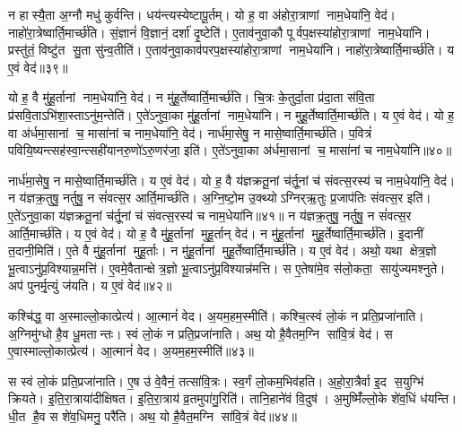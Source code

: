    न हास्यै॒ता अ॒ग्नौ मधु॑ कुर्वन्ति।
   धय॑न्त्यस्येष्टापू॒र्तम्।
   यो ह॒ वा अ॑होरा॒त्राणां नाम॒धेया॑नि॒ वेद॑।
   नाहो॑रा॒त्रेष्वार्ति॒मार्च्छ॑ति।
   सं॒ज्ञानं॑ वि॒ज्ञानं॒ दर्\mbox{}शा॑ दृ॒ष्टेति॑।
   ए॒ताव॑नुवा॒कौ पूर्वप॒क्षस्या॑\-होरा॒त्राणां नाम॒धेया॑नि।
   प्रस्तु॑तं॒ विष्टु॑त सु॒ता सु॑न्व॒तीति॑।
   ए॒ताव॑नुवा॒काव॑पर\-प॒क्षस्या॑होरा॒त्राणां नाम॒धेया॑नि।
   नाहो॑रा॒त्रेष्वार्ति॒मार्च्छ॑ति।
   य ए॒वं वेद॑॥३९॥

   यो ह॒ वै मु॑हू॒र्तानां नाम॒धेया॑नि॒ वेद॑।
   न मु॑हू॒र्तेष्वार्ति॒मार्च्छ॑ति।
   चि॒त्रः के॒तुर्दा॒ता प्र॑दा॒ता स॑वि॒ता प्र॑सवि॒ताऽभि॑शा॒स्ताऽनु॑\-म॒न्तेति॑।
   ए॒ते॑ऽनुवा॒का मु॑हू॒र्तानां नाम॒धेया॑नि।
   न मुहू॒र्तेष्वार्ति॒मार्च्छ॑ति।
   य ए॒वं वेद॑।
   यो ह॒ वा अ॑र्धमा॒सानां च॒ मासा॑नां च नाम॒धेया॑नि॒ वेद॑।
   नार्ध॑मा॒सेषु॒ न मासे॒ष्वार्ति॒मार्च्छ॑ति।
   प॒वित्रं॑ पवियि॒ष्यन्त्सह॑\-स्वा॒न्त्सही॑यानरु॒णो॑ऽरु॒णर॑जा॒ इति॑।
   ए॒ते॑ऽनुवा॒का अ॑र्धमा॒सानां च॒ मासा॑नां च नाम॒धेया॑नि॥४०॥

   नार्ध॑मा॒सेषु॒ न मासे॒ष्वार्ति॒मार्च्छ॑ति।
   य ए॒वं वेद॑।
   यो ह॒ वै य॑ज्ञक्रतू॒नां च॑र्तू॒नां च॑ संवत्स॒रस्य॑ च नाम॒धेया॑नि॒ वेद॑।
   न य॑ज्ञक्र॒तुषु॒ नर्तुषु॒ न सं॑वत्स॒र आर्ति॒मार्च्छ॑ति।
   अ॒ग्नि॒ष्टो॒म उ॒क्थ्योऽग्निर्{‌}ऋ॒तुः प्र॒जाप॑तिः संवत्स॒र इति॑।
   ए॒ते॑ऽनुवा॒का य॑ज्ञक्रतू॒नां च॑र्तू॒नां च॑ संवत्स॒रस्य॑ च नाम॒धेया॑नि॥४१॥
   न य॑ज्ञक्र॒तुषु॒ नर्तुषु॒ न सं॑वत्स॒र आर्ति॒मार्च्छ॑ति।
   य ए॒वं वेद॑।
   यो ह॒ वै मु॑हू॒र्तानां मुहू॒र्तान् वेद॑।
   न मु॑हू॒र्तानां मुहू॒र्तेष्वार्ति॒मार्च्छ॑ति।
   इ॒दानीं त॒दानी॒मिति॑।
   ए॒ते वै मु॑हू॒र्तानां मुहू॒र्ताः।
   न मु॑हू॒र्तानां मुहू॒र्तेष्वार्ति॒मार्च्छ॑ति।
   य ए॒वं वेद॑।
   अथो॒ यथा क्षेत्र॒ज्ञो भू॒त्वाऽनु॑प्र॒विश्यान्न॒मत्ति॑।
   ए॒वमे॒वैतान्क्षेत्र॒ज्ञो भू॒त्वाऽनु॑प्र॒विश्यान्न॑मत्ति।
   स ए॒तेषा॑मे॒व स॑लो॒कता॒ सायु॑ज्यमश्नुते।
   अप॑ पुनर्मृ॒त्युं ज॑यति।
   य ए॒वं वेद॑॥४२॥
\anuvakamend
				
   कश्चि॑द्ध॒ वा अ॒स्माल्लो॒कात्प्रेत्य॑।
   आ॒त्मानं॑ वेद।
   अ॒यम॒हम॒स्मीति॑।
   कश्चि॒त्स्वं लो॒कं न प्रति॒प्रजा॑नाति।
   अ॒ग्निमु॑ग्धो है॒व धू॒मतान्तः।
   स्वं लो॒कं न प्रति॒प्रजा॑नाति।
   अथ॒ यो है॒वैतम॒ग्नि सा॑वि॒त्रं वेद॑।
   स ए॒वास्माल्लो॒कात्प्रेत्य॑।
   आ॒त्मानं॑ वेद।
   अ॒यम॒हम॒स्मीति॑॥४३॥

   स स्वं लो॒कं प्रति॒प्रजा॑नाति।
   ए॒ष उ॑ वे॒वैनं॒ तत्सा॑वि॒त्रः।
   स्व॒र्गं लो॒कम॒भिव॑हति।
   अ॒हो॒रा॒त्रैर्वा इ॒द स॒युग्भि॑ क्रियते।
   इ॒ति॒रा॒त्राया॑दीक्षिषत।
   इ॒ति॒रा॒त्राय॑ व्र॒तमुपा॑गु॒रिति॑।
   तानि॒हाने॑वं वि॒दुष॑।
   अ॒मुष्मिँ॑ल्लो॒के शे॑व॒धिं ध॑यन्ति।
   धी॒त है॒व स शे॑व॒धिमनु॒ परै॑ति।
   अथ॒ यो है॒वैत॒मग्नि सा॑वि॒त्रं वेद॑॥४४॥

